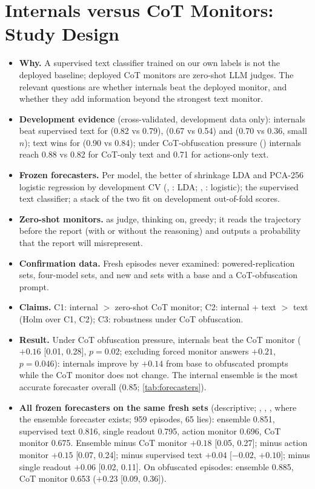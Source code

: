 \section{Internals versus CoT Monitors: Study Design}
\label{app:cotmon}
\begin{itemize}
\item \textbf{Why.} A supervised text classifier trained on our own labels is not the deployed baseline; deployed CoT monitors are zero-shot LLM judges. The relevant questions are whether internals beat the deployed monitor, and whether they add information beyond the strongest text monitor.
\item \textbf{Development evidence} (cross-validated, development data only): internals beat supervised text for \Oss (0.82 vs 0.79), \Muse (0.67 vs 0.54) and \Qwen (0.70 vs 0.36, small $n$); text wins for \Gemma (0.90 vs 0.84); under CoT-obfuscation pressure (\Oss) internals reach 0.88 vs 0.82 for CoT-only text and 0.71 for actions-only text.
\item \textbf{Frozen forecasters.} Per model, the better of shrinkage LDA and PCA-256 logistic regression by development CV (\Gemma, \Oss: LDA; \Muse, \Qwen: logistic); the supervised text classifier; a stack of the two fit on development out-of-fold scores.
\item \textbf{Zero-shot monitors.} \Qwen as judge, thinking on, greedy; it reads the trajectory before the report (with or without the reasoning) and outputs a probability that the report will misrepresent.
\item \textbf{Confirmation data.} Fresh episodes never examined: \Muse powered-replication sets, \Qwen four-model sets, and new \Gemma and \Oss sets with a base and a CoT-obfuscation prompt.
\item \textbf{Claims.} C1: internal $>$ zero-shot CoT monitor; C2: internal + text $>$ text (Holm over C1, C2); C3: robustness under CoT obfuscation.
\item \textbf{Result.} Under CoT obfuscation pressure, internals beat the CoT monitor ($+0.16$ [0.01, 0.28], $p=0.02$; excluding forced monitor answers $+0.21$, $p=0.046$): internals improve by $+0.14$ from base to obfuscated prompts while the CoT monitor does not change. The internal ensemble is the most accurate forecaster overall (0.85; \cref{tab:forecasters}).
\item \textbf{All frozen forecasters on the same fresh sets} (descriptive; \Gemma, \Oss, \Qwen, where the ensemble forecaster exists; 959 episodes, 65 lies): ensemble 0.851, supervised text 0.816, single readout 0.795, action monitor 0.696, CoT monitor 0.675. Ensemble minus CoT monitor $+0.18$ [0.05, 0.27]; minus action monitor $+0.15$ [0.07, 0.24]; minus supervised text $+0.04$ [$-0.02$, $+0.10$]; minus single readout $+0.06$ [0.02, 0.11]. On obfuscated episodes: ensemble 0.885, CoT monitor 0.653 ($+0.23$ [0.09, 0.36]).

\end{itemize}
